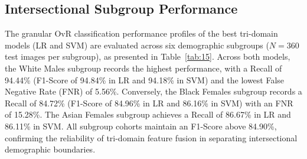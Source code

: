 \subsection{Intersectional Subgroup Performance}
\label{sec:intersectional_subgroup_performance}
\label{sec:subgroup_performance}

The granular OvR classification performance profiles of the best tri-domain models (LR and SVM) are evaluated across six demographic subgroups ($N = 360$ test images per subgroup), as presented in Table~\ref{tab:15}. Across both models, the White Males subgroup records the highest performance, with a Recall of 94.44\% (F1-Score of 94.84\% in LR and 94.18\% in SVM) and the lowest False Negative Rate (FNR) of 5.56\%. Conversely, the Black Females subgroup records a Recall of 84.72\% (F1-Score of 84.96\% in LR and 86.16\% in SVM) with an FNR of 15.28\%. The Asian Females subgroup achieves a Recall of 86.67\% in LR and 86.11\% in SVM. All subgroup cohorts maintain an F1-Score above 84.90\%, confirming the reliability of tri-domain feature fusion in separating intersectional demographic boundaries.

\begin{table}[htbp]
\caption{Intersectional Subgroup Performance and Algorithmic Fairness Profile.}
\label{tab:15}
\label{tab:XV}
\centering
\footnotesize
\setlength{\tabcolsep}{6pt}
\end{table}

